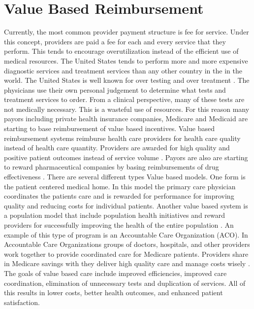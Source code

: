 \documentclass[sigconf]{acmart}
\begin{document}
\section{Value Based Reimbursement}
Currently, the most common provider payment structure is fee for service. Under this concept, providers are paid a fee for each and every service that they perform. This tends to encourage overutilization instead of the efficient use of medical resources. The United States tends to perform more and more expensive diagnostic services and treatment services than any other country in the in the world. The United States is well known for over testing and over treatment \cite{www-google-PBSO}. The physicians use their own personal judgement to determine what tests and treatment services to order.  From a clinical perspective, many of these tests are not medically necessary. This is a wasteful use of resources. 
For this reason many payors including private health insurance companies, Medicare and Medicaid are starting to base reimbursement of value based incentives.  Value based reimbursement systems reimburse health care providers for health care quality instead of health care quantity. Providers are awarded for high quality and positive patient outcomes instead of service volume \cite{www-google-McDonald}.  Payors are also are starting to reward pharmaceutical companies by basing reimbursements of drug effectiveness \cite{www-google-McKinsey}. 
There are several different types Value based models. One form is the patient centered medical home. In this model the primary care physician coordinates the patients care and is rewarded for performance for improving quality and reducing costs for individual patients. Another value based system is a population model that include population health initiatives and reward providers for successfully improving the health of the entire population \cite{www-google-liason}. An example of this type of program is an Accountable Care Organization (ACO). In Accountable Care Organizations groups of doctors, hospitals, and other providers work together to provide coordinated care for Medicare patients. Providers share in Medicare savings with they deliver high quality care and manage costs wisely \cite{www-google-ACO}.
The goals of value based care include improved efficiencies, improved care coordination, elimination of  unnecessary tests and duplication of services.  All of this results in lower costs, better health outcomes, and enhanced patient satisfaction. 
\end{document}
